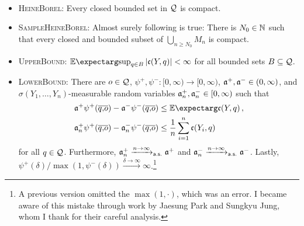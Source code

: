 \begin{assumptions}\mbox{ }
\begin{itemize}
	\item \textsc{HeineBorel}: Every closed bounded set in $\mathcal{Q}$ is compact.
	\item \textsc{SampleHeineBorel}: Almost surely following is true: There is $N_0\in\mathbb{N}$ such that every closed and bounded subset of $\bigcup_{n\geq N_0} M_n$ is compact.
	\item \textsc{UpperBound}: $\Ex{\sup_{q\in B} \abs{\mf c(Y,q)}} < \infty$ for all bounded sets $B\subseteq\mathcal{Q}$.
	\item \textsc{LowerBound}: There are $o\in\mathcal{Q}$, $\psi^+, \psi^- \colon [0,\infty) \to [0,\infty)$, $\mathfrak{a}^+, \mathfrak{a}^- \in(0,\infty)$, and $\sigma(Y_1, \dots, Y_n)$-measurable random variables $\mathfrak{a}^+_n, \mathfrak{a}^-_n \in[0,\infty)$ such that 
	\begin{align*}
		\mf a^+ \psi^+(\ol qo) - \mf a^- \psi^-(\ol qo) &\leq \Ex{\mf c(Y, q)}
		\eqcm\\
		\mf a^+_n \psi^+(\ol qo) - \mf a^-_n \psi^-(\ol qo) &\leq \frac1n \sum_{i=1}^n \mf c(Y_i, q)
	\end{align*}
	for all $q\in\mathcal{Q}$. Furthermore, $\mathfrak{a}^+_n\xrightarrow{n\to\infty}_{\mathsf{a.s.}}\mathfrak{a}^+$ and $\mathfrak{a}^-_n\xrightarrow{n\to\infty}_{\mathsf{a.s.}}\mathfrak{a}^-$. Lastly, $\psi^+(\delta)/\max(1, \psi^-(\delta))\xrightarrow{\delta\to\infty}\infty$.\footnote{A previous version omitted the $\max(1,\cdot)$, which was an error. I became aware of this mistake through work by Jaesung Park and Sungkyu Jung, whom I thank for their careful analysis.}
	\end{itemize}
\end{assumptions}
%
